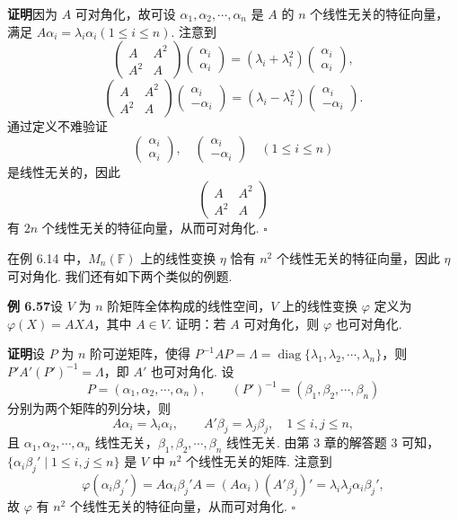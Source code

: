 \documentclass[UTF8, 12pt, fontset=fandol, oneside]{ctexart}
\begin{document}
\noindent\textbf{证明}\quad 因为 $A$ 可对角化，故可设 $\alpha_1,\alpha_2,\cdots,\alpha_n$ 是 $A$ 的 $n$ 个线性无关的特征向量，满足 $A\alpha_i=\lambda_i\alpha_i(1\le i\le n)$. 注意到
\[
\left(\begin{array}{cc}
A & A^2\\
A^2 & A
\end{array}\right)
\left(\begin{array}{c}
\alpha_i\\
\alpha_i
\end{array}\right)
=(\lambda_i+\lambda_i^2)
\left(\begin{array}{c}
\alpha_i\\
\alpha_i
\end{array}\right),
\]
\[
\left(\begin{array}{cc}
A & A^2\\
A^2 & A
\end{array}\right)
\left(\begin{array}{c}
\alpha_i\\
-\alpha_i
\end{array}\right)
=(\lambda_i-\lambda_i^2)
\left(\begin{array}{c}
\alpha_i\\
-\alpha_i
\end{array}\right).
\]
通过定义不难验证
\[
\left(\begin{array}{c}
\alpha_i\\
\alpha_i
\end{array}\right),\quad
\left(\begin{array}{c}
\alpha_i\\
-\alpha_i
\end{array}\right)
\quad (1\le i\le n)
\]
是线性无关的，因此
\[
\left(\begin{array}{cc}
A & A^2\\
A^2 & A
\end{array}\right)
\]
有 $2n$ 个线性无关的特征向量，从而可对角化. $\square$

在例 6.14 中，$M_n(\mathbb{F})$ 上的线性变换 $\eta$ 恰有 $n^2$ 个线性无关的特征向量，因此 $\eta$ 可对角化. 我们还有如下两个类似的例题.

\noindent\textbf{例 6.57}\quad 设 $V$ 为 $n$ 阶矩阵全体构成的线性空间，$V$ 上的线性变换 $\varphi$ 定义为 $\varphi(X)=AXA$，其中 $A\in V$. 证明：若 $A$ 可对角化，则 $\varphi$ 也可对角化.

\noindent\textbf{证明}\quad 设 $P$ 为 $n$ 阶可逆矩阵，使得 $P^{-1}AP=\Lambda=\operatorname{diag}\{\lambda_1,\lambda_2,\cdots,\lambda_n\}$，则 $P'A'(P')^{-1}=\Lambda$，即 $A'$ 也可对角化. 设
\[
P=(\alpha_1,\alpha_2,\cdots,\alpha_n),\qquad (P')^{-1}=(\beta_1,\beta_2,\cdots,\beta_n)
\]
分别为两个矩阵的列分块，则
\[
A\alpha_i=\lambda_i\alpha_i,\qquad A'\beta_j=\lambda_j\beta_j,\quad 1\le i,j\le n,
\]
且 $\alpha_1,\alpha_2,\cdots,\alpha_n$ 线性无关，$\beta_1,\beta_2,\cdots,\beta_n$ 线性无关. 由第 3 章的解答题 3 可知，$\{\alpha_i\beta_j'\mid 1\le i,j\le n\}$ 是 $V$ 中 $n^2$ 个线性无关的矩阵. 注意到
\[
\varphi(\alpha_i\beta_j')=A\alpha_i\beta_j'A=(A\alpha_i)(A'\beta_j)'=\lambda_i\lambda_j\alpha_i\beta_j',
\]
故 $\varphi$ 有 $n^2$ 个线性无关的特征向量，从而可对角化. $\square$
\end{document}
